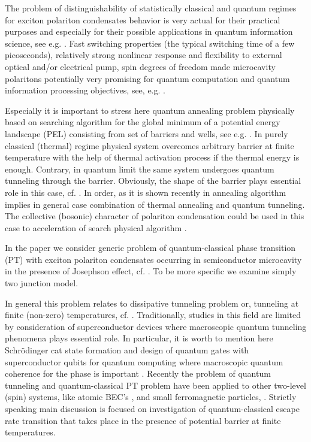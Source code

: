 \documentclass[aps, pre, preprint, groupedaddress, superscriptaddress, showkeys, showpacs] {revtex4-1}
\begin{document}
The problem of distinguishability of statistically classical and quantum regimes for exciton polariton condensates behavior is very actual for their practical purposes and especially for their possible applications in quantum information science, see e.g. \cite{Dominici}.
Fast switching properties (the typical switching time of a few picoseconds), relatively strong nonlinear response and flexibility to external optical and/or electrical pump, spin degrees of freedom made microcavity polaritons potentially very promising for quantum computation and quantum information processing objectives, see, e.g. \cite{Demirchyan,Pagel,Kyriienko,Solnyshkov_2015, Dominici}.

Especially it is important to stress here quantum annealing problem physically based on searching algorithm for the global minimum of a potential energy landscape (PEL) consisting from set of barriers and wells, see e.g.  \cite{Santoro, Das}. In purely classical  (thermal) regime physical system overcomes arbitrary barrier at finite temperature with the help of thermal activation process if the thermal energy is enough. Contrary, in quantum limit the same system undergoes quantum tunneling through the barrier. Obviously, the shape of the barrier plays essential role in this case, cf. \cite{Das, Lewenstein}. In order, as it is shown recently  in \cite{Lewenstein} annealing algorithm implies in general case combination of thermal annealing and quantum tunneling. The     
collective (bosonic) character of polariton condensation could be used in this case to acceleration of search physical algorithm \cite{Yan}.  
  
In the paper we consider generic problem  of quantum-classical phase transition (PT) with exciton polariton condensates occurring in semiconductor microcavity in the presence of Josephson effect, cf. \cite{Chudnovsky_1997,Aleiner, Shelykh_2008, Borgh_2010}. To be more specific we examine simply two junction model.
 
In general this problem relates to dissipative tunneling problem or, tunneling at finite (non-zero) temperatures, cf. \cite{Caldeira, Larkin, Riseborough}.
Traditionally,  studies in this field are limited by consideration of superconductor devices \cite{Ankerhold} where macroscopic quantum tunneling phenomena plays essential role.
In particular, it is worth to mention here Schr\"odinger cat state formation \cite{Leggett} and design of quantum gates with superconductor qubits for quantum computing where macroscopic quantum coherence for the phase is important \cite{Makhlin}.
Recently the problem of quantum tunneling and quantum-classical PT problem have been applied to other two-level (spin) systems, like atomic BEC's \cite{Zhang}, and small ferromagnetic particles, \cite{Owerre}.
Strictly speaking main discussion is focused on investigation of quantum-classical escape rate transition that takes place in the presence of potential barrier at finite temperatures.
  
\end{document}
